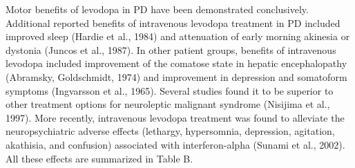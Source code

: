 Motor benefits of levodopa in PD have been demonstrated conclusively. Additional reported benefits of intravenous levodopa treatment in PD included improved sleep (Hardie et al., 1984) and attenuation of early morning akinesia or dystonia (Juncos et al., 1987).  In other patient groups, benefits of intravenous levodopa included improvement of the comatose state in hepatic encephalopathy (Abramsky, Goldschmidt, 1974) and improvement in depression and somatoform symptoms (Ingvarsson et al., 1965).  Several studies found it to be superior to other treatment options for neuroleptic malignant syndrome (Nisijima et al., 1997).  More recently, intravenous levodopa treatment was found to alleviate the neuropsychiatric adverse effects (lethargy, hypersomnia, depression, agitation, akathisia, and confusion) associated with interferon-alpha (Sunami et al., 2002). All these effects are summarized in Table B.